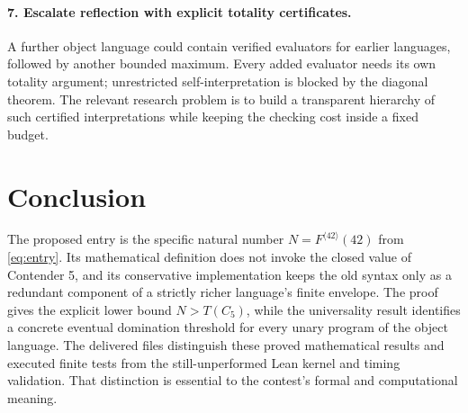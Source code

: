 \documentclass[11pt]{article}
\theoremstyle{definition}
\newcommand{\Cfive}{C_5}
\newcommand{\itf}[3]{#1^{\langle #2\rangle}(#3)}
\begin{document}
\paragraph{7. Escalate reflection with explicit totality certificates.}
A further object language could contain verified evaluators for earlier
languages, followed by another bounded maximum. Every added evaluator needs
its own totality argument; unrestricted self-interpretation is blocked by the
diagonal theorem. The relevant research problem is to build a transparent
hierarchy of such certified interpretations while keeping the checking cost
inside a fixed budget.

\section{Conclusion}
The proposed entry is the specific natural number $N=\itf F{42}{42}$ from
\eqref{eq:entry}. Its mathematical definition does not invoke the closed value
of Contender 5, and its conservative implementation keeps the old syntax only
as a redundant component of a strictly richer language's finite envelope.
The proof gives the explicit lower bound $N>T(\Cfive)$, while the universality
result identifies a concrete eventual domination threshold for every unary
program of the object language. The delivered files distinguish these proved
mathematical results and executed finite tests from the still-unperformed Lean
kernel and timing validation. That distinction is essential to the contest's
formal and computational meaning.

\appendix
\end{document}
